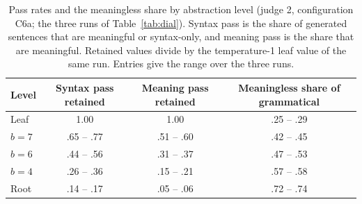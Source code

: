 \documentclass[11pt,letterpaper]{article}
\begin{document}
\begin{table}[h]
\caption{Pass rates and the meaningless share by abstraction level (judge 2, configuration C6a; the three runs of Table~\ref{tab:dial}).
Syntax pass is the share of generated sentences that are meaningful or syntax-only, and meaning pass is the share that are meaningful. Retained values divide by the temperature-1 leaf value of the same run.
Entries give the range over the three runs.}
\label{tab:law}
\begin{center}
\small
\begin{tabular}{lccc}
\toprule
Level & Syntax pass retained & Meaning pass retained & Meaningless share of grammatical \\
\midrule
Leaf & 1.00 & 1.00 & .25 -- .29 \\
$b=7$ & .65 -- .77 & .51 -- .60 & .42 -- .45 \\
$b=6$ & .44 -- .56 & .31 -- .37 & .47 -- .53 \\
$b=4$ & .26 -- .36 & .15 -- .21 & .57 -- .58 \\
Root & .14 -- .17 & .05 -- .06 & .72 -- .74 \\
\bottomrule
\end{tabular}
\end{center}
\end{table}
\end{document}

